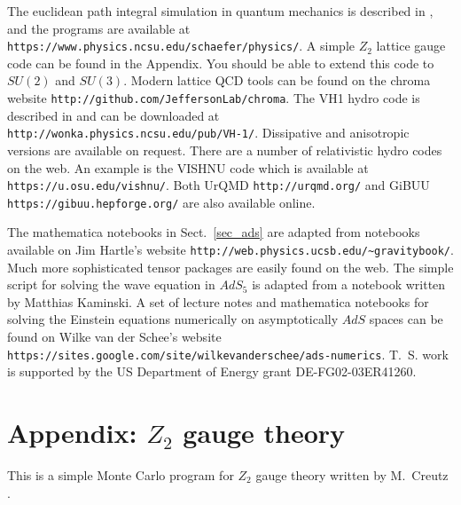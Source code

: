 \begin{acknowledgement}
The euclidean path integral simulation in quantum
mechanics is described in \cite{Schafer:2004xa}, and the programs are 
available at {\tt https://www.physics.ncsu.edu/schaefer/{\allowbreak}physics/}. 
A simple $Z_2$ lattice gauge code can be found in the Appendix. You should be
able to extend this code to $SU(2)$ and $SU(3)$. Modern lattice QCD tools
can be found on the chroma website {\tt http://github.com/JeffersonLab/chroma}.
The VH1 hydro code is described in \cite{Blondin:1993} and can be downloaded
at {\tt http://wonka.{\allowbreak}physics.ncsu.edu/pub/VH-1/}. Dissipative 
and anisotropic versions are available on request. There are a number of 
relativistic hydro codes on the web. An example is the VISHNU code 
\cite{Shen:2014vra} which is available at {\tt https://u.osu.edu/vishnu/}. 
Both UrQMD {\tt http://urqmd.org/} and GiBUU 
{\tt https://gibuu.{\allowbreak}hepforge.org/} are also available online.

 The mathematica notebooks in Sect.~\ref{sec_ads} are adapted from
notebooks available on Jim Hartle's website 
{\tt http://web.{\allowbreak}physics.ucsb.edu/{\textasciitilde}gravitybook/}. 
Much more sophisticated tensor packages are easily found on the web. 
The simple script for solving the wave equation in $AdS_5$ is adapted 
from a notebook written by Matthias Kaminski. A set of lecture notes 
and mathematica notebooks for solving the Einstein equations numerically
on asymptotically $AdS$ spaces can be found on Wilke van der Schee's website
{\tt https://sites.google.com/site/{\allowbreak}wilkevanderschee/ads-numerics}.
T.~S. work is supported by the US Department 
of Energy grant DE-FG02-03ER41260. 

\end{acknowledgement}



\section*{Appendix: $Z_2$ gauge theory}
 This is a simple Monte Carlo program for $Z_2$ gauge theory 
written by M.~Creutz \cite{Creutz:2004}.

